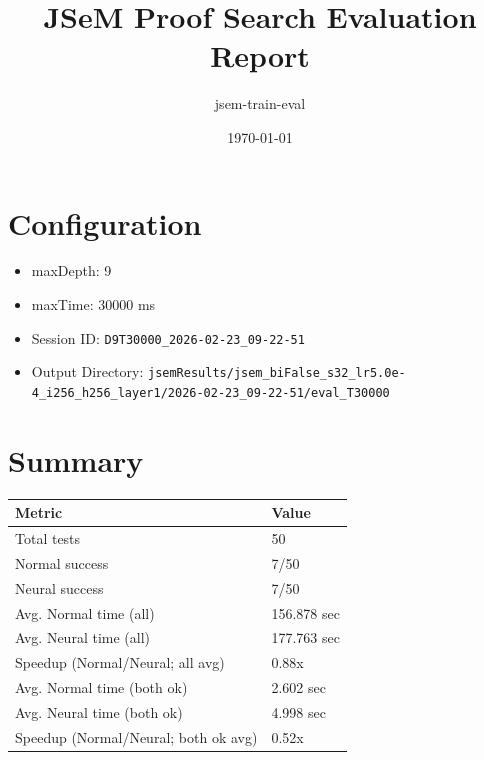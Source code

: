 \documentclass[a4paper,10pt]{article}
\title{JSeM Proof Search Evaluation Report}
\author{jsem-train-eval}
\date{\today}
\begin{document}
\maketitle

\section{Configuration}
\begin{itemize}
\item maxDepth: 9
\item maxTime: 30000 ms
\item Session ID: \texttt{D9T30000\_2026-02-23\_09-22-51}
\item Output Directory: \texttt{jsemResults/jsem\_biFalse\_s32\_lr5.0e-4\_i256\_h256\_layer1/2026-02-23\_09-22-51/eval\_T30000}
\end{itemize}

\section{Summary}
\begin{tabular}{ll}
\toprule
\textbf{Metric} & \textbf{Value} \\
\midrule
Total tests & 50 \\
Normal success & 7/50 \\
Neural success & 7/50 \\
\midrule
Avg. Normal time (all) & 156.878 sec \\
Avg. Neural time (all) & 177.763 sec \\
Speedup (Normal/Neural; all avg) & 0.88x \\
Avg. Normal time (both ok) & 2.602 sec \\
Avg. Neural time (both ok) & 4.998 sec \\
Speedup (Normal/Neural; both ok avg) & 0.52x \\
\bottomrule
\end{tabular}
\end{document}
